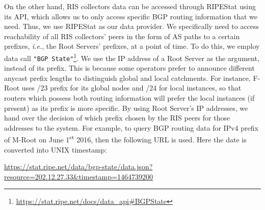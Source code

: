 On the other hand, RIS collectors data can be accessed through RIPEStat using its API, which allows us to only access specific BGP routing information that we need. Thus, we use RIPEStat as our data provider. We specifically need to access reachability of all RIS collectors' peers in the form of AS paths to a certain prefixes, \textit{i.e.}, the Root Servers' prefixes, at a point of time. To do this, we employ data call \texttt{"BGP State"}\footnote{\url{https://stat.ripe.net/docs/data_api\#BGPState}}. We use the IP address of a Root Server as the argument, instead of its prefix. This is because some operators prefer to announce different anycast prefix lengths to distinguish global and local catchments. For instance, F-Root uses /23 prefix for its global nodes and /24 for local instances, so that routers which possess both routing information will prefer the local instances (if present) as its prefix is more specific. By using Root Server's IP addresses, we hand over the decision of which prefix chosen by the RIS peers for those addresses to the system. For example, to query BGP routing data for IPv4 prefix of M-Root on June 1\textsuperscript{st} 2016, then the following URL is used. Here the date is converted into UNIX timestamp:

\url{https://stat.ripe.net/data/bgp-state/data.json?resource=202.12.27.33&timestamp=1464739200}


